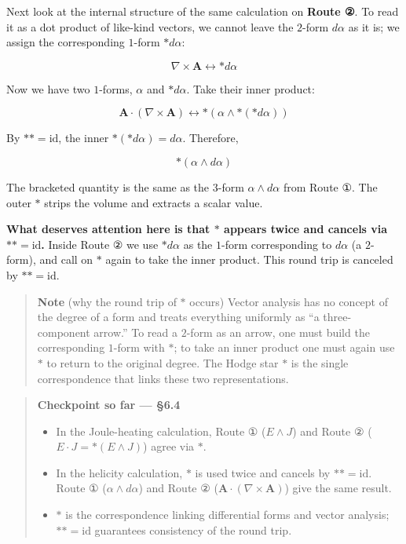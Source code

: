 Next look at the internal structure of the same calculation on
\textbf{Route ②}. To read it as a dot product of like-kind vectors, we
cannot leave the \(2\)-form \(d\alpha\) as it is; we assign the
corresponding \(1\)-form \(\ast d\alpha\):

\[\nabla \times \mathbf{A} \longleftrightarrow \ast d\alpha\]

Now we have two \(1\)-forms, \(\alpha\) and \(\ast d\alpha\). Take their
inner product:

\[\mathbf{A} \cdot (\nabla \times \mathbf{A}) \longleftrightarrow \ast(\alpha \wedge \ast(\ast d\alpha))\]

By \(\ast\ast = \mathrm{id}\), the inner
\(\ast(\ast d\alpha) = d\alpha\). Therefore,

\[\ast(\alpha \wedge d\alpha)\]

The bracketed quantity is the same as the \(3\)-form
\(\alpha \wedge d\alpha\) from Route ①. The outer \(\ast\) strips the
volume and extracts a scalar value.

\textbf{What deserves attention here is that $\ast$ appears twice and cancels via $\ast\ast = \mathrm{id}$.}
Inside Route ② we use \(\ast d\alpha\) as the \(1\)-form corresponding
to \(d\alpha\) (a \(2\)-form), and call on \(\ast\) again to take the
inner product. This round trip is canceled by
\(\ast\ast = \mathrm{id}\).

\begin{quote}
\textbf{Note} (why the round trip of \(\ast\) occurs) Vector analysis
has no concept of the degree of a form and treats everything uniformly
as ``a three-component arrow.'' To read a \(2\)-form as an arrow, one
must build the corresponding \(1\)-form with \(\ast\); to take an inner
product one must again use \(\ast\) to return to the original degree.
The Hodge star \(\ast\) is the single correspondence that links these
two representations.
\end{quote}

\begin{quote}
\textbf{Checkpoint so far — §6.4}

\begin{itemize}
\item
  In the Joule-heating calculation, Route ① (\(E \wedge J\)) and Route ②
  (\(E \cdot J = \ast(E \wedge J)\)) agree via \(\ast\).
\item
  In the helicity calculation, \(\ast\) is used twice and cancels by
  \(\ast\ast = \mathrm{id}\). Route ① (\(\alpha \wedge d\alpha\)) and
  Route ② (\(\mathbf{A} \cdot (\nabla \times \mathbf{A})\)) give the
  same result.
\item
  \(\ast\) is the correspondence linking differential forms and vector
  analysis; \(\ast\ast = \mathrm{id}\) guarantees consistency of the
  round trip.
\end{itemize}
\end{quote}

